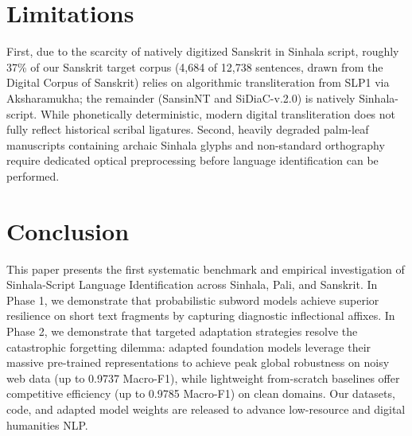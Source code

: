 \documentclass[11pt]{article}
\begin{document}
\section{Limitations}
First, due to the scarcity of natively digitized Sanskrit in Sinhala script, roughly 37\% of our Sanskrit target corpus (4,684 of 12,738 sentences, drawn from the Digital Corpus of Sanskrit) relies on algorithmic transliteration from SLP1 via Aksharamukha; the remainder (SansinNT and SiDiaC-v.2.0) is natively Sinhala-script. While phonetically deterministic, modern digital transliteration does not fully reflect historical scribal ligatures. Second, heavily degraded palm-leaf manuscripts containing archaic Sinhala glyphs and non-standard orthography require dedicated optical preprocessing before language identification can be performed.

\section{Conclusion}
This paper presents the first systematic benchmark and empirical investigation of Sinhala-Script Language Identification across Sinhala, Pali, and Sanskrit. In Phase 1, we demonstrate that probabilistic subword models achieve superior resilience on short text fragments by capturing diagnostic inflectional affixes. In Phase 2, we demonstrate that targeted adaptation strategies resolve the catastrophic forgetting dilemma: adapted foundation models leverage their massive pre-trained representations to achieve peak global robustness on noisy web data (up to 0.9737 Macro-F1), while lightweight from-scratch baselines offer competitive efficiency (up to 0.9785 Macro-F1) on clean domains. Our datasets, code, and adapted model weights are released to advance low-resource and digital humanities NLP.
\end{document}

